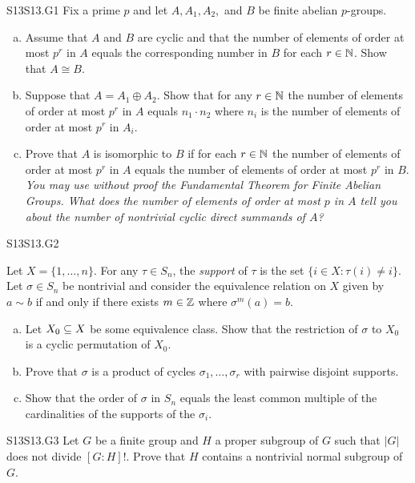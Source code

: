 \documentclass[../AlgebraQualSolutions.tex]{subfiles}
\begin{document}
\begin{prob}{S13}{S13.G1}
	Fix a prime $p$ and let $A, A_1, A_2,$ and $B$ be finite abelian $p$-groups.

	\begin{enumerate}[(a)]
		\item Assume that $A$ and $B$ are cyclic and that the number of elements of order at most $p^r$ in $A$ equals the corresponding number in $B$ for each $r \in \mathbb{N}$. Show that $A \cong B$.
		\item Suppose that $A = A_1 \oplus A_2$. Show that for any $r \in \mathbb{N}$ the number of elements of order at most $p^r$ in $A$ equals $n_1\cdot n_2$ where $n_i$ is the number of elements of order at most $p^r$ in $A_i$.
		\item Prove that $A$ is isomorphic to $B$ if for each $r\in \mathbb{N}$ the number of elements of order at most $p^r$ in $A$ equals the number of elements of order at most $p^r$ in $B$. \emph{You may use without proof the Fundamental Theorem for Finite Abelian Groups. What does the number of elements of order at most $p$ in $A$ tell you about the number of nontrivial cyclic direct summands of $A$?}
	\end{enumerate}
\end{prob}

\begin{prob}{S13}{S13.G2}

	Let  $X = \{1,\ldots, n\}$. For any $\tau \in S_n$, the \emph{support} of $\tau$ is the set $\{i \in X: \tau(i) \neq i\}$. Let $\sigma \in S_n$ be nontrivial and consider the equivalence relation on $X$ given by $a \sim b$ if and only if there exists $m \in \mathbb{Z}$ where $\sigma^m(a) = b$.

	\begin{enumerate}[(a)]
		\item Let $X_0 \subseteq X$ be some equivalence class. Show that the restriction of $\sigma$ to $X_0$ is a cyclic permutation of $X_0$.
		\item Prove that $\sigma$ is a product of cycles $\sigma_1,\ldots,\sigma_r$ with pairwise disjoint supports.
		\item Show that the order of $\sigma$ in $S_n$ equals the least common multiple of the cardinalities of the supports of the $\sigma_i$.
	\end{enumerate}
\end{prob}

\begin{prob}{S13}{S13.G3}
	Let $G$ be a finite group and $H$ a proper subgroup of $G$ such that $|G|$ does not divide $[G:H]!$. Prove that $H$ contains a nontrivial normal subgroup of $G$.
\end{prob}
\end{document}
